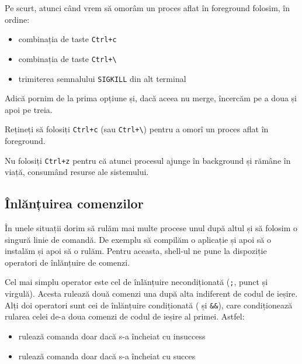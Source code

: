 Pe scurt, atunci când vrem să omorâm un proces aflat în foreground folosim, în
ordine:

\begin{itemize}
  \item combinația de taste \texttt{Ctrl+c}
  \item combinația de taste \texttt{Ctrl+\textbackslash{}}
  \item trimiterea semnalului \texttt{SIGKILL} din alt terminal
\end{itemize}

Adică pornim de la prima opțiune și, dacă aceea nu merge, încercăm pe a doua și
apoi pe treia.

\begin{note}
Rețineți să folosiți \texttt{Ctrl+c} (sau \texttt{Ctrl+\textbackslash{}}) pentru a omorî un proces aflat în foreground.

Nu folosiți \texttt{Ctrl+z} pentru că atunci procesul ajunge în background și rămâne în
viață, consumând resurse ale sistemului.
\end{note}

\subsection{Înlănțuirea comenzilor}
\label{sec:procese-operatii-inlantuire}

În unele situații dorim să rulăm mai multe procese unul după altul și să folosim
o singură linie de comandă. De exemplu să compilăm o aplicație și apoi să o
instalăm și apoi să o rulăm. Pentru aceasta, shell-ul ne pune la dispoziție
operatori de înlănțuire de comenzi.

Cel mai simplu operator este cel de înlănțuire necondiționată (\texttt{;}, punct și virgulă). Acesta
rulează două comenzi una după alta indiferent de codul de ieșire. Alți doi
operatori sunt cei de înlănțuire condiționată (\texttt{\textbar{}\textbar{}} și \texttt{\&\&}), care condiționează rularea celei
de-a doua comenzi de codul de ieșire al primei. Astfel:

\begin{itemize}
  \item {} rulează comanda  doar dacă  s-a încheiat
		cu insuccess
  \item {} rulează comanda  doar dacă  s-a
		încheiat cu succes
\end{itemize}


